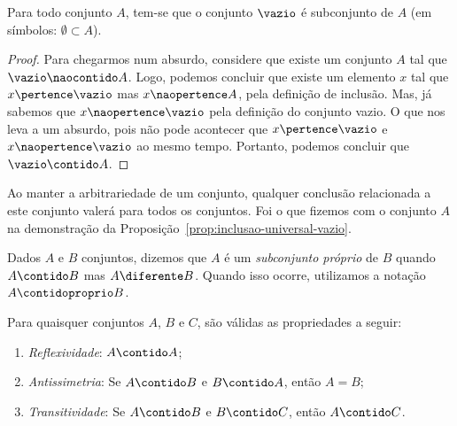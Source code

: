 \begin{proposition}
	\label{prop:inclusao-universal-vazio}
	Para todo conjunto $A$, tem-se que o conjunto $\vazio$ é subconjunto de $A$ (em símbolos: $\emptyset \subset A$).
\end{proposition}

\begin{proof}
	Para chegarmos num absurdo, considere que existe um conjunto $A$ tal que $\vazio \naocontido A$. Logo, podemos concluir que existe um elemento $x$ tal que $x \pertence \vazio$ mas $x \naopertence A$, pela definição de inclusão. Mas, já sabemos que $x \naopertence \vazio$ pela definição do conjunto vazio. O que nos leva a um absurdo, pois não pode acontecer que $x \pertence \vazio$ e $x \naopertence \vazio$ ao mesmo tempo. Portanto, podemos concluir que $\vazio \contido A$.
\end{proof}

\begin{remark}
	Ao manter a arbitrariedade de um conjunto, qualquer conclusão relacionada a este conjunto valerá para todos os conjuntos. Foi o que fizemos com o conjunto $A$ na demonstração da Proposição~\ref{prop:inclusao-universal-vazio}.
\end{remark}

\begin{definition}
	Dados $A$ e $B$ conjuntos, dizemos que $A$ é um \emph{subconjunto próprio} de $B$ quando $A \contido B$ mas $A \diferente B$. Quando isso ocorre, utilizamos a notação $A \contidoproprio B$.
\end{definition}

\begin{proposition}
	Para quaisquer conjuntos $A$, $B$ e $C$, são válidas as propriedades a seguir:
	\begin{enumerate}
		\item
			\label{inclusao:reflexividade}
			\emph{Reflexividade}: $A \contido A$;
		\item
			\label{inclusao:antissimetria}
			\emph{Antissimetria}: Se $A \contido B$ e $B \contido A$, então $A = B$;
		\item
			\label{inclusao:transitividade}
			\emph{Transitividade}: Se $A \contido B$ e $B \contido C$, então $A \contido C$.
	\end{enumerate}
\end{proposition}

